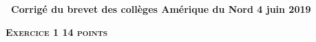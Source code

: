 \documentclass[10pt]{article}
\begin{document}
\setlength\parindent{0mm}

\pagestyle{fancy}
\thispagestyle{empty}
\begin{center} { \Large{ \textbf{\decofourleft~Corrigé du brevet des collèges Amérique du Nord 4 juin 2019~\decofourright}}} 

\end{center}
\vspace{0,5cm}

\textbf{\textsc{Exercice 1 \hfill 14 points}}

\medskip
\newpage
%	
%	
%	
%
%
%
%
\end{document}
